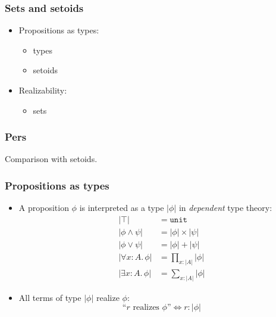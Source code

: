 \documentclass[t]{beamer}
\begin{document}
\begin{frame}
  \frametitle{Sets and setoids}

  \begin{itemize}
  \item Propositions as types:
    \begin{itemize}
    \item types
    \item setoids
    \end{itemize}
  \item Realizability:
    \begin{itemize}
    \item sets
    \end{itemize}
  \end{itemize}

\end{frame}

\begin{frame}
  \frametitle{Pers}

  Comparison with setoids.

\end{frame}

\begin{frame}
  \frametitle{Propositions as types}

  \begin{itemize}
  \item A proposition $\phi$ is interpreted as a type $|\phi|$ in
    \emph{dependent} type theory:
    \begin{align*}
      |\top| &= \mathtt{unit} \\
      |\phi \land \psi| &= |\phi| \times |\psi| \\
      |\phi \lor \psi| &= |\phi| + |\psi| \\
      |\forall x : A .\, \phi| &= \textstyle\prod_{x : |A|} |\phi| \\
      |\exists x : A .\, \phi| &= \textstyle\sum_{x : |A|} |\phi|
    \end{align*}
  \item All terms of type $|\phi|$ realize $\phi$:
    \begin{equation*}
      \text{``$r$ realizes $\phi$''} \iff r : |\phi|
    \end{equation*}
  \end{itemize}
\end{frame}
\end{document}
